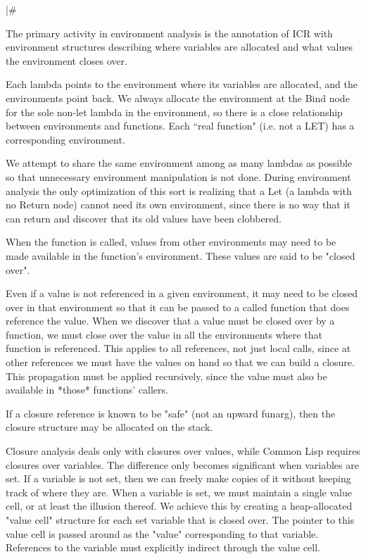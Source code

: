 |\#

The primary activity in environment analysis is the annotation of ICR with
environment structures describing where variables are allocated and what values
the environment closes over.

Each lambda points to the environment where its variables are allocated, and
the environments point back.  We always allocate the environment at the Bind
node for the sole non-let lambda in the environment, so there is a close
relationship between environments and functions.  Each ``real function" (i.e.
not a LET) has a corresponding environment.

We attempt to share the same environment among as many lambdas as possible so
that unnecessary environment manipulation is not done.  During environment
analysis the only optimization of this sort is realizing that a Let (a lambda
with no Return node) cannot need its own environment, since there is no way
that it can return and discover that its old values have been clobbered.

When the function is called, values from other environments may need to be made
available in the function's environment.  These values are said to be "closed
over".

Even if a value is not referenced in a given environment, it may need to be
closed over in that environment so that it can be passed to a called function
that does reference the value.  When we discover that a value must be closed
over by a function, we must close over the value in all the environments where
that function is referenced.  This applies to all references, not just local
calls, since at other references we must have the values on hand so that we can
build a closure.  This propagation must be applied recursively, since the value
must also be available in *those* functions' callers.

If a closure reference is known to be "safe" (not an upward funarg), then the
closure structure may be allocated on the stack.

Closure analysis deals only with closures over values, while Common Lisp
requires closures over variables.  The difference only becomes significant when
variables are set.  If a variable is not set, then we can freely make copies of
it without keeping track of where they are.  When a variable is set, we must
maintain a single value cell, or at least the illusion thereof.  We achieve
this by creating a heap-allocated "value cell" structure for each set variable
that is closed over.  The pointer to this value cell is passed around as the
"value" corresponding to that variable.  References to the variable must
explicitly indirect through the value cell.

